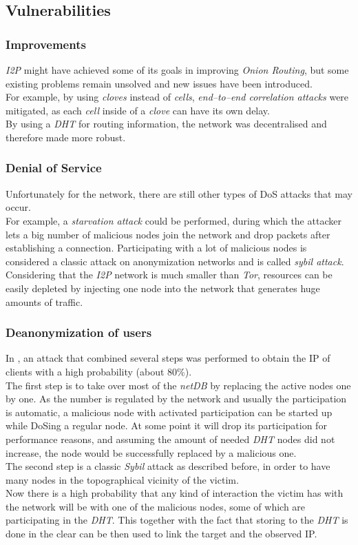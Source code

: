 \documentclass{sig-alternate}
\begin{document}
\subsection{Vulnerabilities}
\subsubsection{Improvements}
\emph{I2P} might have achieved some of its goals in improving \emph{Onion Routing}, but some existing problems remain unsolved and new issues have been introduced. 
\\
For example, by using \emph{cloves} instead of \emph{cells}, \emph{end--to--end correlation attacks} were mitigated, as each \emph{cell} inside of a \emph{clove} can have its own delay.
\\
By using a \emph{DHT} for routing information, the network was decentralised and therefore made more robust\cite{zantout2011}.

\subsubsection{Denial of Service}
Unfortunately for the network, there are still other types of DoS attacks that may occur.
\\
For example, a \emph{starvation attack} could be performed, during which the attacker lets a big number of malicious nodes join the network and drop packets after establishing a connection.
Participating with a lot of malicious nodes is considered a classic attack on anonymization networks and is called \emph{sybil attack}.
\\
Considering that the \emph{I2P} network is much smaller than \emph{Tor}, resources can be easily depleted by injecting one node into the network that generates huge amounts of traffic\cite{zantout2011}.

\subsubsection{Deanonymization of users}
In \cite{egger2013}, an attack that combined several steps was performed to obtain the IP of clients with a high probability (about 80\%).
\\
The first step is to take over most of the \emph{netDB} by replacing the active nodes one by one.
As the number is regulated by the network and usually the participation is automatic, a malicious node with activated participation can be started up while DoSing a regular node.
At some point it will drop its participation for performance reasons, and assuming the amount of needed \emph{DHT} nodes did not increase, the node would be successfully replaced by a malicious one.
\\
The second step is a classic \emph{Sybil} attack as described before, in order to have many nodes in the topographical vicinity of the victim.
\\
Now there is a high probability that any kind of interaction the victim has with the network will be with one of the malicious nodes, some of which are participating in the \emph{DHT}.
This together with the fact that storing to the \emph{DHT} is done in the clear can be then used to link the target and the observed IP.
\end{document}
